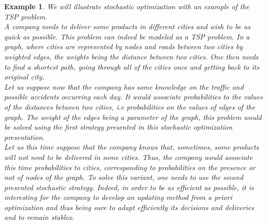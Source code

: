 \documentclass[a4paper]{book}
\newtheorem{ex}{Example}[chapter]
\begin{document}
\begin{ex}
We will illustrate stochastic optimization with an example of the {\sc TSP} problem.\\
A company needs to deliver some products in different cities and wish to be as quick as possible. This problem can indeed be modeled as a {\sc TSP} problem. In a graph, where cities are represented by nodes and roads between two cities by weighted edges, the weights being the distance between two cities. One then needs to find a shortest path, going through all of the cities once and getting back to its original city. \\
Let us suppose now that the company has some knowledge on the traffic and possible accidents occurring each day. It would associate probabilities to the values of the distances between two cities, i.e probabilities on the values of edges of the graph. The weight of the edges being a parameter of the graph, this problem would be solved using the first strategy presented in this stochastic optimization presentation. \\
Let us this time suppose that the company knows that, sometimes, some products will not need to be delivered in some cities. Thus, the company would associate this time probabilities to cities, corresponding to probabilities on the presence or not of nodes of the graph. To solve this variant, one needs to use the second presented stochastic strategy. Indeed, in order to be as efficient as possible, it is interesting for the company to develop an updating method from \textit{a priori} optimization and thus being sure to adapt efficiently its decisions and deliveries and to remain stablex. 
\end{ex}
\end{document}
